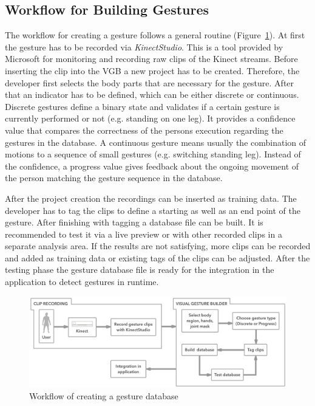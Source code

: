 \subsection{Workflow for Building Gestures}
The workflow for creating a gesture follows a general routine (Figure~\ref{fig:5_3_gestureCreation}).
At first the gesture has to be recorded via \textit{KinectStudio}.
This is a tool provided by Microsoft for monitoring and recording raw clips of the Kinect streams.
Before inserting the clip into the VGB a new project has to be created.
Therefore, the developer first selects the body parts that are necessary for the gesture.
After that an indicator has to be defined, which can be either discrete or continuous.
Discrete gestures define a binary state and validates if a certain gesture is currently performed or not (e.g. standing on one leg).
It provides a confidence value that compares the correctness of the persons execution regarding the gestures in the database.
A continuous gesture means usually the combination of motions to a sequence of small gestures (e.g. switching standing leg).
Instead of the confidence, a progress value gives feedback about the ongoing movement of the person matching the gesture sequence in the database.

After the project creation the recordings can be inserted as training data.
The developer has to tag the clips to define a starting as well as an end point of the gesture.
After finishing with tagging a database file can be built.
It is recommended to test it via a live preview or with other recorded clips in a separate analysis area.
If the results are not satisfying, more clips can be recorded and added as training data or existing tags of the clips can be adjusted.
After the testing phase the gesture database file is ready for the integration in the application to detect gestures in runtime. %
\begin{figure}[htb]
	\centering
	\begin{minipage}[t]{1\linewidth}
		\centering
		\includegraphics[width=1\linewidth]{Pictures/5_3_gestureCreation}
		\caption{Workflow of creating a gesture database}
		\label{fig:5_3_gestureCreation}
	\end{minipage}
\end{figure}